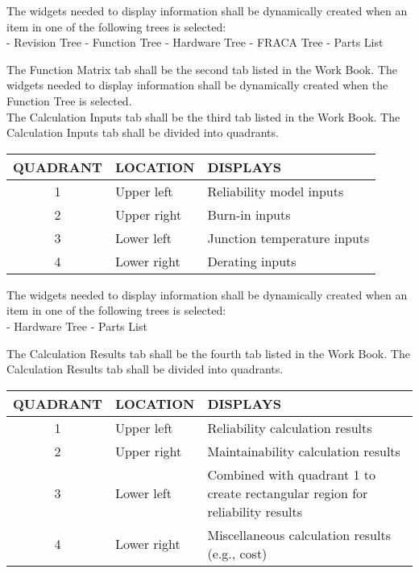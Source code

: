 \documentclass[11pt, 12pt, twoside, onecolumn]{article}
\begin{document}
The widgets needed to display information shall be dynamically created when an item in one of the following trees is selected: \\

    - Revision Tree
    - Function Tree
    - Hardware Tree
    - FRACA Tree
    - Parts List

\noindent The Function Matrix tab shall be the second tab listed in the Work Book.  The widgets needed to display information shall be dynamically created when the Function Tree is selected. \\

\noindent The Calculation Inputs tab shall be the third tab listed in the Work Book.  The Calculation Inputs tab shall be divided into quadrants. \\

    \begin{longtable}{cll}
    QUADRANT & LOCATION & DISPLAYS \\
    \hline
    1 & Upper left & Reliability model inputs \\
    2 & Upper right & Burn-in inputs \\
    3 & Lower left & Junction temperature inputs \\
    4 & Lower right & Derating inputs \\
    \hline
    \end{longtable}

The widgets needed to display information shall be dynamically created when an item in one of the following trees is selected: \\

    - Hardware Tree
    - Parts List

\noindent The Calculation Results tab shall be the fourth tab listed in the Work Book.  The Calculation Results tab shall be divided into quadrants. \\

    \begin{longtable}{cll}
    QUADRANT & LOCATION & DISPLAYS \\
    \hline
    1 & Upper left & Reliability calculation results \\
    2 & Upper right & Maintainability calculation results \\
    3 & Lower left & Combined with quadrant 1 to create rectangular region for reliability results \\
    4 & Lower right & Miscellaneous calculation results (e.g., cost) \\
    \hline
    \end{longtable}
\end{document}
